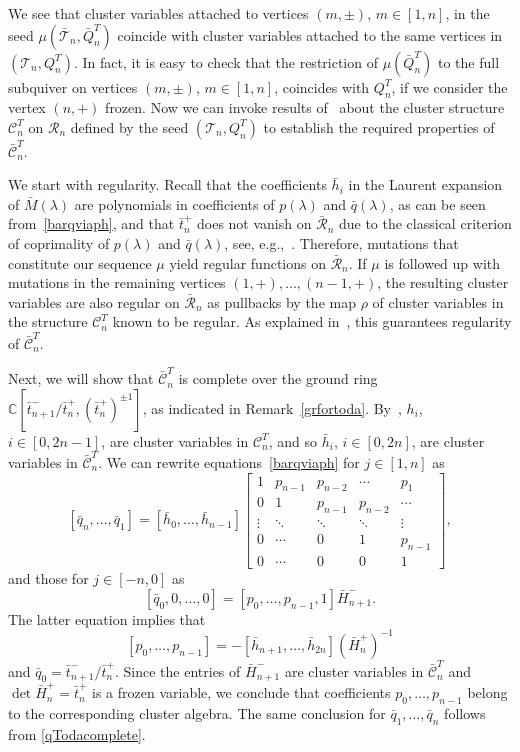 \documentclass{amsart}
\theoremstyle{definition}
\theoremstyle{remark}
\numberwithin{equation}{section}
\numberwithin{theorem}{section}
\def\C{{\mathbb C}}
\def\CC{{\mathcal C}}
\def\RR{{\mathcal R}}
\def\TE{{\mathcal T}}
\begin{document}
We see that cluster variables attached to vertices $(m,\pm)$, $m\in[1,n]$, in the seed $\mu(\bar\TE_n, \bar Q_n^T)$ coincide with cluster variables attached to the same vertices in $(\TE_n, Q_n^T)$. In fact, it is easy to check that the restriction of $\mu(\bar Q_n^T)$ to the full subquiver on vertices $(m,\pm)$, $m\in[1,n]$, coincides with $Q_n^T$, if we consider the vertex $(n,+)$ frozen. Now we can invoke results of~\cite{GSV_Acta} about the cluster structure $\CC_n^T$ on 
$\RR_n$ defined by the seed $(\TE_n, Q_n^T)$ to establish the required properties of $\bar\CC_n^T$.

We start with regularity. Recall that the coefficients $\bar h_i$ in the Laurent expansion of $\bar M(\lambda)$ are polynomials in coefficients of $p(\lambda)$ and $\bar q(\lambda)$, as can be seen from~\eqref{barqviaph}, 
and that $\bar t_n^+$ does not vanish on $\bar\RR_n$ due to the classical criterion of coprimality of $p(\lambda)$ and  
$\bar q(\lambda)$, see, e.g.,~\cite[Theorem 8.39]{Fuh}. Therefore, mutations that constitute our sequence $\mu$ yield regular functions on $\bar\RR_n$. If  $\mu$ is followed up with mutations in the remaining vertices $(1,+),\ldots, (n-1,+)$, the resulting cluster variables are also regular on $\bar\RR_n$ as pullbacks by the map $\rho$ of cluster variables in  the structure $\CC_n^T$ known to be regular. As explained in~\cite[Section 9]{quasichris}, this guarantees regularity of $\bar\CC_n^T$.

Next, we will show that $\bar\CC_n^T$ is complete over the ground ring $\C[\bar t_{n+1}^-/\bar t_n^+, (\bar t_n^+)^{\pm1}]$, as indicated in Remark~\ref{grfortoda}. By~\cite[Lemma 5.3]{GSV_Acta}, $h_i$, $i\in[0, 2n-1]$, are cluster variables in 
$\CC_n^T$, and so $\bar h_i$, $i\in[0,2n]$, are cluster variables in $\bar\CC_n^T$.  We can rewrite equations~\eqref{barqviaph} for $j\in[1,n]$ as 
\begin{equation}
\label{qTodacomplete}
[\bar q_n,\ldots, \bar q_1]= [\bar h_0,\ldots, \bar h_{n-1}] 
\begin{bmatrix}
1 & p_{n-1} & p_{n-2} & \cdots &p_1\\
0 & 1 & p_{n-1} & p_{n-2} & \cdots\\
\vdots & \ddots & \ddots & \ddots & \vdots\\
0 & \cdots & 0 &1 & p_{n-1}\\
0 &  \cdots& 0  & 0 & 1
\end{bmatrix},
\end{equation}
and those for $j\in[-n,0]$ as 
\begin{equation}
\label{pTodacomplete}
[\bar q_0,0,\ldots, 0]= [p_0,\ldots, p_{n-1},1] \bar H^-_{n+1}.
\end{equation}
The latter equation implies that 
\[
[p_0,\ldots, p_{n-1}] = - [\bar h_{n+1},\ldots, \bar h_{2n}] \left (\bar H^+_{n} \right )^{-1}
\]
and $\bar q_0 = \bar t_{n+1}^-/\bar t_n^+$.
Since the entries of $\bar H^-_{n+1}$ are cluster variables in $\bar\CC_n^T$ and $\det \bar H^+_{n}= \bar t_n^+$ is a frozen variable, we conclude that coefficients $p_0,\ldots, p_{n-1}$ belong to the corresponding cluster algebra. The same conclusion for $\bar q_1,\ldots, \bar q_n$ follows from \eqref{qTodacomplete}.
\end{document}
